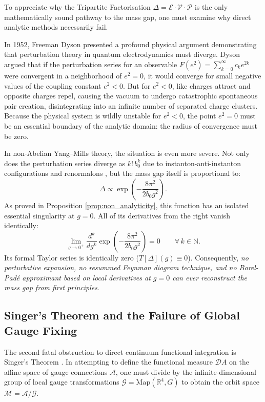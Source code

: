 To appreciate why the Tripartite Factorisation $\Delta = \mathcal{E} \cdot \mathcal{V} \cdot \mathcal{P}$ is the only mathematically sound pathway to the mass gap, one must examine why direct analytic methods necessarily fail.

In 1952, Freeman Dyson \cite{Dyson1952} presented a profound physical argument demonstrating that perturbation theory in quantum electrodynamics must diverge. Dyson argued that if the perturbation series for an observable $F(e^2) = \sum_{k=0}^\infty c_k e^{2k}$ were convergent in a neighborhood of $e^2 = 0$, it would converge for small negative values of the coupling constant $e^2 < 0$. But for $e^2 < 0$, like charges attract and opposite charges repel, causing the vacuum to undergo catastrophic spontaneous pair creation, disintegrating into an infinite number of separated charge clusters. Because the physical system is wildly unstable for $e^2 < 0$, the point $e^2 = 0$ must be an essential boundary of the analytic domain: the radius of convergence must be zero.

In non-Abelian Yang--Mills theory, the situation is even more severe. Not only does the perturbation series diverge as $k! \, b_0^k$ due to instanton-anti-instanton configurations and renormalons \cite{tHooft1979}, but the mass gap itself is proportional to:
\begin{equation}
\Delta \propto \exp\left( -\frac{8\pi^2}{2 b_0 g^2} \right).
\end{equation}
As proved in Proposition \ref{prop:non_analyticity}, this function has an isolated essential singularity at $g = 0$. All of its derivatives from the right vanish identically:
\begin{equation}
\lim_{g \to 0^+} \frac{d^k}{dg^k} \exp\left( -\frac{8\pi^2}{2 b_0 g^2} \right) = 0 \qquad \forall \, k \in \mathbb{N}.
\end{equation}
Its formal Taylor series is identically zero ($T[\Delta](g) \equiv 0$). Consequently, \emph{no perturbative expansion, no resummed Feynman diagram technique, and no Borel-Pad{\'e} approximant based on local derivatives at $g = 0$ can ever reconstruct the mass gap from first principles}.

\subsection{Singer's Theorem and the Failure of Global Gauge Fixing}
\label{subsec:singer_theorem_gribov}

The second fatal obstruction to direct continuum functional integration is Singer's Theorem \cite{Singer1978}. In attempting to define the functional measure $\mathcal{D}A$ on the affine space of gauge connections $\mathcal{A}$, one must divide by the infinite-dimensional group of local gauge transformations $\mathcal{G} = \mathrm{Map}(\mathbb{R}^4, G)$ to obtain the orbit space $\mathcal{M} = \mathcal{A}/\mathcal{G}$.

